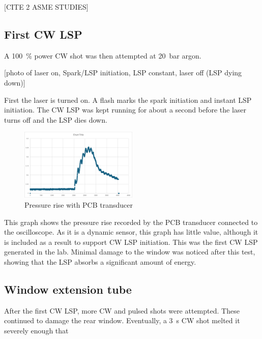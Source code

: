             [CITE 2 ASME STUDIES]


        \subsection{First CW LSP}
            
            A \qty{100}{\%} power CW shot was then attempted at \qty{20}{bar} argon. 

            [photo of laser on, Spark/LSP initiation, LSP constant, laser off (LSP dying down)]

            First the laser is turned on. A flash marks the spark initiation and instant LSP initiation. The CW LSP was kept running for about a second before the laser turns off and the LSP dies down.

            \begin{figure}[!ht]
                \centering
                \includegraphics[width=0.5\textwidth]{assets/4 experiments/CW pressure rise.png}
                \caption{Pressure rise with PCB transducer}
            \end{figure}

            This graph shows the pressure rise recorded by the PCB transducer connected to the oscilloscope. As it is a dynamic sensor, this graph has little value, although it is included as a result to support CW LSP initiation. This was the first CW LSP generated in the lab. Minimal damage to the window was noticed after this test, showing that the LSP absorbs a significant amount of energy.

        \subsection{Window extension tube}
            
            After the first CW LSP, more CW and pulsed shots were attempted. These continued to damage the rear window. Eventually, a \qty{3}{s} CW shot melted it severely enough that 

